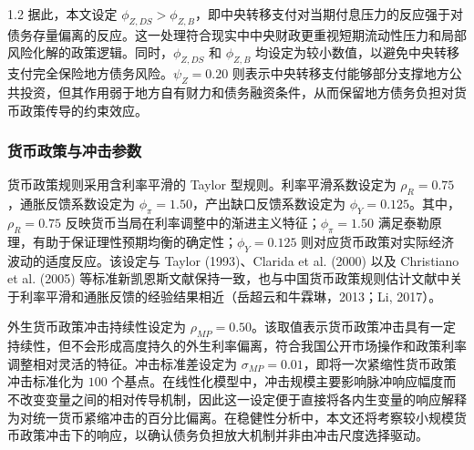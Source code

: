 \documentclass[12pt,UTF8]{ctexart}
\begin{document}
\begin{spacing}{1.2}
		据此，本文设定 $\phi_{Z,DS}>\phi_{Z,B}$，即中央转移支付对当期付息压力的反应强于对债务存量偏离的反应。这一处理符合现实中中央财政更重视短期流动性压力和局部风险化解的政策逻辑。同时，$\phi_{Z,DS}$ 和 $\phi_{Z,B}$ 均设定为较小数值，以避免中央转移支付完全保险地方债务风险。$\psi_Z=0.20$ 则表示中央转移支付能够部分支撑地方公共投资，但其作用弱于地方自有财力和债务融资条件，从而保留地方债务负担对货币政策传导的约束效应。
		
		\subsubsection{货币政策与冲击参数}
		
		货币政策规则采用含利率平滑的 Taylor 型规则。利率平滑系数设定为 $\rho_R=0.75$，通胀反馈系数设定为 $\phi_\pi=1.50$，产出缺口反馈系数设定为 $\phi_Y=0.125$。其中，$\rho_R=0.75$ 反映货币当局在利率调整中的渐进主义特征；$\phi_\pi=1.50$ 满足泰勒原理，有助于保证理性预期均衡的确定性；$\phi_Y=0.125$ 则对应货币政策对实际经济波动的适度反应。该设定与 Taylor (1993)、Clarida et al. (2000) 以及 Christiano et al. (2005) 等标准新凯恩斯文献保持一致，也与中国货币政策规则估计文献中关于利率平滑和通胀反馈的经验结果相近（岳超云和牛霖琳，2013；Li, 2017）。
		
		外生货币政策冲击持续性设定为 $\rho_{MP}=0.50$。该取值表示货币政策冲击具有一定持续性，但不会形成高度持久的外生利率偏离，符合我国公开市场操作和政策利率调整相对灵活的特征。冲击标准差设定为 $\sigma_{MP}=0.01$，即将一次紧缩性货币政策冲击标准化为 $100$ 个基点。在线性化模型中，冲击规模主要影响脉冲响应幅度而不改变变量之间的相对传导机制，因此这一设定便于直接将各内生变量的响应解释为对统一货币紧缩冲击的百分比偏离。在稳健性分析中，本文还将考察较小规模货币政策冲击下的响应，以确认债务负担放大机制并非由冲击尺度选择驱动。
		

\end{spacing}
\end{document}
